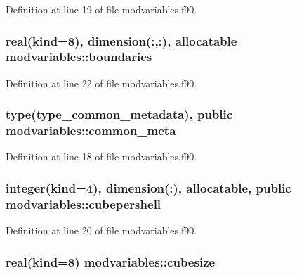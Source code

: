 Definition at line 19 of file modvariables.\-f90.

\hypertarget{classmodvariables_a0dd99db73cadd4dfd2c39cdc09b6da9b}{
\subsubsection[{boundaries}]{\setlength{\rightskip}{0pt plus 5cm}real(kind=8), dimension(\-:,\-:), allocatable modvariables\-::boundaries}}\label{classmodvariables_a0dd99db73cadd4dfd2c39cdc09b6da9b}


Definition at line 22 of file modvariables.\-f90.

\hypertarget{classmodvariables_a11cf222c240e4152287181f343d97e4c}{
\subsubsection[{common\-\_\-meta}]{\setlength{\rightskip}{0pt plus 5cm}type(type\-\_\-common\-\_\-metadata), public modvariables\-::common\-\_\-meta}}\label{classmodvariables_a11cf222c240e4152287181f343d97e4c}


Definition at line 18 of file modvariables.\-f90.

\hypertarget{classmodvariables_ab4fedc63b2d055a809f7d9d90dabf305}{
\subsubsection[{cubepershell}]{\setlength{\rightskip}{0pt plus 5cm}integer(kind=4), dimension(\-:), allocatable, public modvariables\-::cubepershell}}\label{classmodvariables_ab4fedc63b2d055a809f7d9d90dabf305}


Definition at line 20 of file modvariables.\-f90.

\hypertarget{classmodvariables_a12af092709e4d0b68394a217d16c4489}{
\subsubsection[{cubesize}]{\setlength{\rightskip}{0pt plus 5cm}real(kind=8) modvariables\-::cubesize}}\label{classmodvariables_a12af092709e4d0b68394a217d16c4489}



